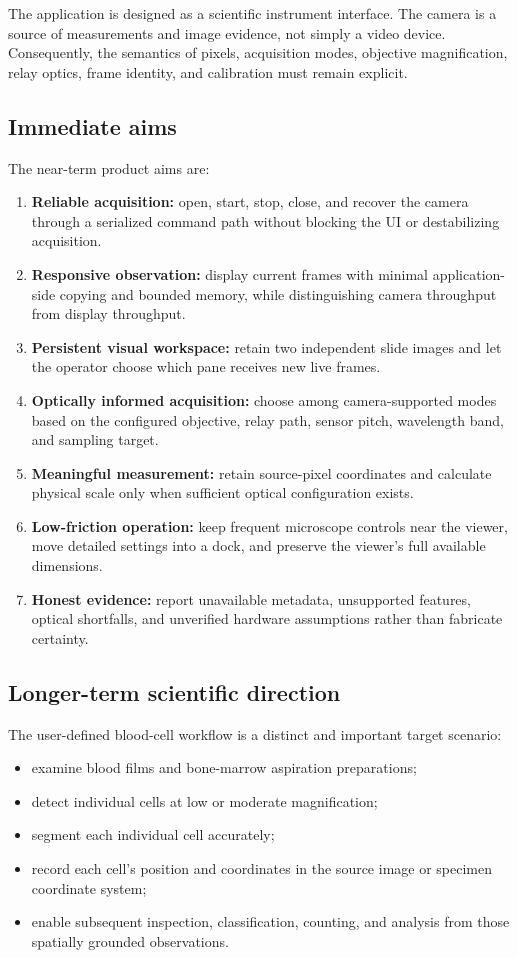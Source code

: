 \documentclass[11pt,a4paper,oneside]{article}
\begin{document}
The application is designed as a scientific instrument interface. The camera is a source of measurements and image evidence, not simply a video device. Consequently, the semantics of pixels, acquisition modes, objective magnification, relay optics, frame identity, and calibration must remain explicit.

\subsection{Immediate aims}
The near-term product aims are:
\begin{enumerate}
  \item \textbf{Reliable acquisition:} open, start, stop, close, and recover the camera through a serialized command path without blocking the UI or destabilizing acquisition.
  \item \textbf{Responsive observation:} display current frames with minimal application-side copying and bounded memory, while distinguishing camera throughput from display throughput.
  \item \textbf{Persistent visual workspace:} retain two independent slide images and let the operator choose which pane receives new live frames.
  \item \textbf{Optically informed acquisition:} choose among camera-supported modes based on the configured objective, relay path, sensor pitch, wavelength band, and sampling target.
  \item \textbf{Meaningful measurement:} retain source-pixel coordinates and calculate physical scale only when sufficient optical configuration exists.
  \item \textbf{Low-friction operation:} keep frequent microscope controls near the viewer, move detailed settings into a dock, and preserve the viewer's full available dimensions.
  \item \textbf{Honest evidence:} report unavailable metadata, unsupported features, optical shortfalls, and unverified hardware assumptions rather than fabricate certainty.
\end{enumerate}

\subsection{Longer-term scientific direction}
The user-defined blood-cell workflow is a distinct and important target scenario:
\begin{itemize}
  \item examine blood films and bone-marrow aspiration preparations;
  \item detect individual cells at low or moderate magnification;
  \item segment each individual cell accurately;
  \item record each cell's position and coordinates in the source image or specimen coordinate system;
  \item enable subsequent inspection, classification, counting, and analysis from those spatially grounded observations.
\end{itemize}
\end{document}
